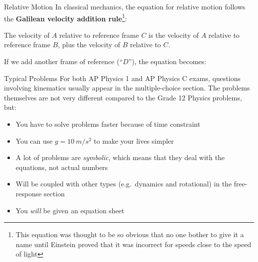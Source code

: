 \documentclass[12pt,compress,aspectratio=169]{beamer}
\newcommand{\mb}[1]{\ensuremath\mathbf{#1}}
\newcommand{\eq}[2]{\vspace{#1}{\Large\begin{displaymath}#2\end{displaymath}}}
\begin{document}
\begin{frame}{Relative Motion}
  In classical mechanics, the equation for relative motion follows the
  \textbf{Galilean velocity addition rule}\footnote{This equation was
    thought to be so obvious that no one bother to give it a name until Einstein
    proved that it was incorrect for speeds close to the speed of light}:

  \eq{-.25in}{
    \boxed{\mb{v}_{AC}=\mb{v}_{AB}+\mb{v}_{BC}}
  }

  \vspace{-.15in}The velocity of $A$ relative to reference frame $C$ is the
  velocity of $A$ relative to reference frame $B$, plus the velocity of $B$
  relative to $C$.

  \vspace{.1in}If we add another frame of reference (``$D$''), the equation
  becomes:

  \eq{-.25in}{
    \mb{v}_{AD}=\mb{v}_{AB}+\mb{v}_{BC}+\mb{v}_{CD}
  }
\end{frame}


\begin{frame}{Typical Problems}
  For both AP Physics 1 and AP Physics C exams, questions involving kinematics
  usually appear in the multiple-choice section. The problems themselves are
  not very different compared to the Grade 12 Physics problems, but:
  \begin{itemize}
  \item You have to solve problems faster because of time constraint
  \item You can use $g=\SI{10}{m/s^2}$ to make your lives simpler
  \item A lot of problems are \emph{symbolic}, which means that they deal with
    the equations, not actual numbers
  \item Will be coupled with other types (e.g.\ dynamics and rotational) in
    the free-response section
  \item You \emph{will} be given an equation sheet
  \end{itemize}
\end{frame}
\end{document}
